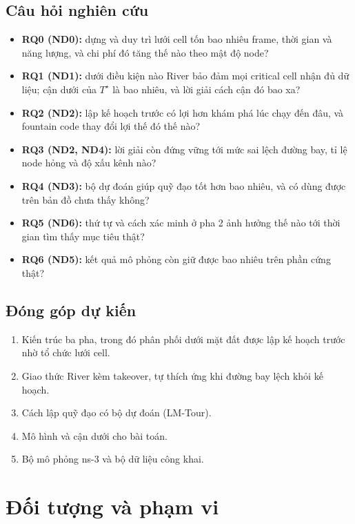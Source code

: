 \subsection{Câu hỏi nghiên cứu}

\begin{itemize}
\tightlist
\item
  \textbf{RQ0 (ND0):} dựng và duy trì lưới cell tốn bao nhiêu frame,
  thời gian và năng lượng, và chi phí đó tăng thế nào theo mật độ node?
\item
  \textbf{RQ1 (ND1):} dưới điều kiện nào River bảo đảm mọi critical cell
  nhận đủ dữ liệu; cận dưới của $T^\star$ là bao nhiêu, và lời giải cách cận đó
  bao xa?
\item
  \textbf{RQ2 (ND2):} lập kế hoạch trước có lợi hơn khám phá lúc chạy
  đến đâu, và fountain code thay đổi lợi thế đó thế nào?
\item
  \textbf{RQ3 (ND2, ND4):} lời giải còn đứng vững tới mức sai lệch đường
  bay, tỉ lệ node hỏng và độ xấu kênh nào?
\item
  \textbf{RQ4 (ND3):} bộ dự đoán giúp quỹ đạo tốt hơn bao nhiêu, và có
  dùng được trên bản đồ chưa thấy không?
\item
  \textbf{RQ5 (ND6):} thứ tự và cách xác minh ở pha 2 ảnh hưởng thế nào
  tới thời gian tìm thấy mục tiêu thật?
\item
  \textbf{RQ6 (ND5):} kết quả mô phỏng còn giữ được bao nhiêu trên phần
  cứng thật?
\end{itemize}

\subsection{Đóng góp dự kiến}

\begin{enumerate}
\def\labelenumi{\arabic{enumi}.}
\tightlist
\item
  Kiến trúc ba pha, trong đó phân phối dưới mặt đất được lập kế hoạch
  trước nhờ tổ chức lưới cell.
\item
  Giao thức River kèm takeover, tự thích ứng khi đường bay lệch khỏi kế
  hoạch.
\item
  Cách lập quỹ đạo có bộ dự đoán (LM-Tour).
\item
  Mô hình và cận dưới cho bài toán.
\item
  Bộ mô phỏng ns-3 và bộ dữ liệu công khai.
\end{enumerate}

\section{Đối tượng và phạm vi}

